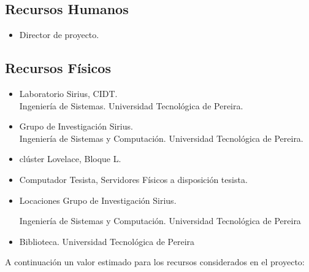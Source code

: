 \documentclass[letterpaper, 12pt, oneside]{article}
\begin{document}
    \subsection{Recursos Humanos}
    \begin{itemize}
        \item Director de proyecto.
    \end{itemize}
    
    \subsection{Recursos Físicos}
    \begin{itemize}
	    \item Laboratorio Sirius, CIDT. \\
	    Ingeniería de Sistemas. Universidad Tecnológica de Pereira. 
        \item Grupo de Investigación Sirius. \\
        Ingeniería de Sistemas y Computación. Universidad Tecnológica de Pereira.
        \item clúster Lovelace, Bloque L.
        \item Computador Tesista, Servidores Físicos a disposición tesista.
        \item Locaciones Grupo de Investigación Sirius. \par Ingeniería de Sistemas y Computación. Universidad Tecnológica de Pereira
        \item Biblioteca. Universidad Tecnológica de Pereira
	\end{itemize}
	
	A continuación un valor estimado para los recursos considerados en el proyecto:
\end{document}
